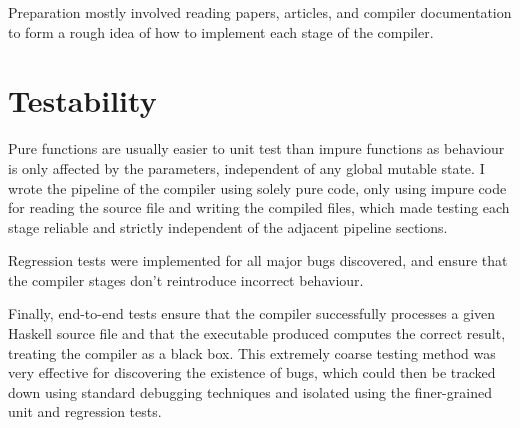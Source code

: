 \documentclass[dissertation.tex]{subfiles}
\begin{document}
Preparation mostly involved reading papers, articles, and compiler documentation to form a rough idea of how to
implement each stage of the compiler. 



\section{Testability}
{

    Pure functions are usually easier to unit test than impure functions as behaviour is only affected by the
    parameters, independent of any global mutable state. I wrote the pipeline of the compiler using solely pure code,
    only using impure code for reading the source file and writing the compiled files, which made testing each stage
    reliable and strictly independent of the adjacent pipeline sections.

    Regression tests were implemented for all major bugs discovered, and ensure that the compiler stages don't
    reintroduce incorrect behaviour.

    Finally, end-to-end tests ensure that the compiler successfully processes a given Haskell source file and that the
    executable produced computes the correct result, treating the compiler as a black box. This extremely coarse testing
    method was very effective for discovering the existence of bugs, which could then be tracked down using standard
    debugging techniques and isolated using the finer-grained unit and regression tests.


}
\end{document}
